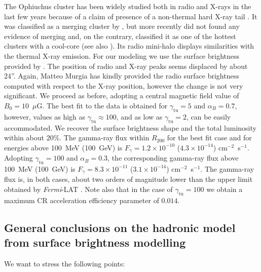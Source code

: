 \documentclass[traditabstract]{aa}
\newcommand{\rmn}{\mathrm}
\begin{document}
The Ophiuchus cluster has been widely studied both in radio and X-rays in the last few years because of a claim of presence of a non-thermal hard X-ray tail \citep{2008A&A...479...27E,2008PASJ...60.1133F,2009A&A...499..371G,2009A&A...499..679M,2009MNRAS.396.2237P,2009A&A...508.1161N,2010A&A...514A..76M,2010MNRAS.405.1624M}. 
It was classified as a merging cluster by \cite{2001PASJ...53..605W}, but more recently \cite{2008PASJ...60.1133F} did not found any evidence of merging and, on the contrary, classified it as one of the hottest clusters with a  cool-core (see also \citealp{2010MNRAS.405.1624M}). Its radio mini-halo displays similarities with the thermal X-ray emission. For our modeling we use the surface brightness provided by \cite{2009A&A...499..679M}. The position of radio and X-ray peaks seems displaced by about 24''. Again, Matteo Murgia has kindly provided the radio surface brightness computed with respect to the \cite{2002ApJ...567..716R} X-ray position, however the change is not very significant. 
We proceed as before, adopting a central magnetic field value of $B_{0}=10$~$\mu$G. The best fit to the data is obtained for $\gamma_{\rmn{tu}}=5$ and $\alpha_B=0.7$, however, values as high as $\gamma_{\rmn{tu}} \approx 100$, and as low as $\gamma_{\rmn{tu}}=2$, can be easily accommodated. We recover the surface brightness shape and the total luminosity within about $20\%$. The gamma-ray flux within $R_{200}$ for the best fit case and for energies above 100~MeV (100~GeV) is $F_{\gamma} = 1.2 \times 10^{-10}$ ($4.3 \times 10^{-14}$) cm$^{-2}$~s$^{-1}$. Adopting $\gamma_{\rmn{tu}}=100$ and $\alpha_B=0.3$, the corresponding gamma-ray flux above 100~MeV (100~GeV) is $F_{\gamma} = 8.3 \times 10^{-11}$ ($3.1 \times 10^{-14}$) cm$^{-2}$~s$^{-1}$. The gamma-ray flux is, in both cases, about two orders of magnitude lower than the upper limit obtained by \emph{Fermi}-LAT \citep{2010ApJ...717L..71A}. Note also that in the case of $\gamma_{\rmn{tu}} = 100$ we obtain a maximum CR acceleration efficiency parameter of $0.014$. 

\subsection{General conclusions on the hadronic model from surface brightness modelling}

We want to stress the following points:
\end{document}
